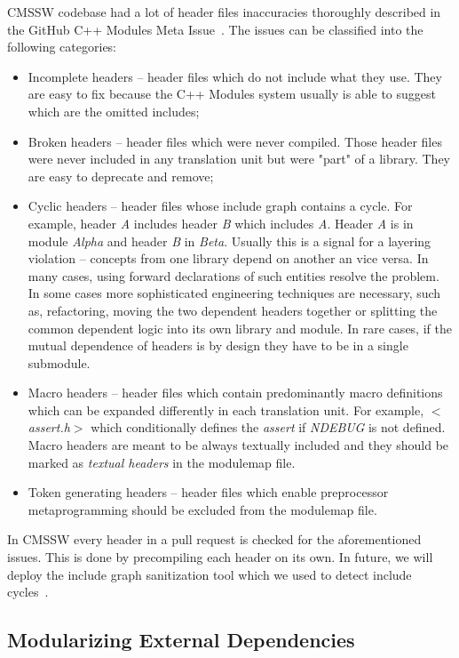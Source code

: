 \documentclass[12pt]{iopart}
\begin{document}
CMSSW codebase had a lot of header files inaccuracies thoroughly described in the GitHub C++ Modules Meta Issue~\cite{Modules-gh-metaissue}. The issues can be classified into the following categories:
\begin{itemize}
    \item Incomplete headers -- header files which do not include what they use. They are easy to fix because the C++ Modules system usually is able to suggest which are the omitted includes;
    \item Broken headers -- header files which were never compiled. Those header files were never included in any translation unit but were "part" of a library. They are easy to deprecate and remove;
    \item Cyclic headers -- header files whose include graph contains a cycle. For example, header \textit{A} includes header \textit{B} which includes \textit{A}. Header \textit{A} is in module \textit{Alpha} and header \textit{B} in \textit{Beta}. Usually this is a signal for a layering violation -- concepts from one library depend on another an vice versa. In many cases, using forward declarations of such entities resolve the problem. In some cases more sophisticated engineering techniques are necessary, such as, refactoring, moving the two dependent headers together or splitting the common dependent logic into its own library and module. In rare cases, if the mutual dependence of headers is by design they have to be in a single submodule.
    \item Macro headers -- header files which contain predominantly macro definitions which can be expanded differently in each translation unit. For example, \textit{$<$assert.h$>$} which conditionally defines the \textit{assert} if \textit{NDEBUG} is not defined. Macro headers are meant to be always textually included and they should be marked as \textit{textual headers} in the modulemap file. 
    \item Token generating headers -- header files which enable preprocessor metaprogramming should be excluded from the modulemap file.
\end{itemize}

In CMSSW every header in a pull request is checked for the aforementioned issues. This is done by precompiling each header on its own. In future, we will deploy the include graph sanitization tool which we used to detect include cycles~\cite{scram-cycle-break}.

\subsection{Modularizing External Dependencies}
\end{document}
